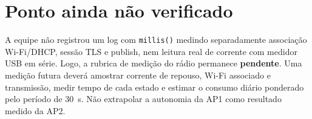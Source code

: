 \section{Ponto ainda não verificado}
A equipe não registrou um log com \texttt{millis()} medindo separadamente associação Wi-Fi/DHCP, sessão TLS e publish, nem leitura real de corrente com medidor USB em série. Logo, a rubrica de medição do rádio permanece \textbf{pendente}. Uma medição futura deverá amostrar corrente de repouso, Wi-Fi associado e transmissão, medir tempo de cada estado e estimar o consumo diário ponderado pelo período de 30~s. Não extrapolar a autonomia da AP1 como resultado medido da AP2.
